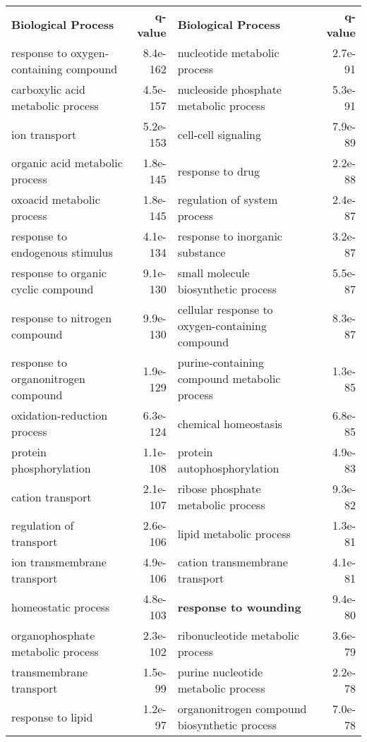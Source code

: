 \documentclass[fleqn,10pt]{SelfArx} %
\begin{document}
\begin{table}[ht]
	\centering
	\scriptsize
	\begin{tabularx}{\textwidth}{lRlR}
		\textbf{\color{white} Biological Process} & \textbf{\color{white} q-value} & \textbf{\color{white} Biological Process} & \textbf{\color{white} q-value}\\
		response to oxygen-containing compound & 8.4e-162 & nucleotide metabolic process & 2.7e-91 \\ 
		carboxylic acid metabolic process & 4.5e-157 & nucleoside phosphate metabolic process & 5.3e-91 \\ 
		ion transport & 5.2e-153 & cell-cell signaling & 7.9e-89 \\ 
		organic acid metabolic process & 1.8e-145 & response to drug & 2.2e-88 \\ 
		oxoacid metabolic process & 1.8e-145 & regulation of system process & 2.4e-87 \\ 
		response to endogenous stimulus & 4.1e-134 & response to inorganic substance & 3.2e-87 \\ 
		response to organic cyclic compound & 9.1e-130 & small molecule biosynthetic process & 5.5e-87 \\ 
		response to nitrogen compound & 9.9e-130 & cellular response to oxygen-containing compound & 8.3e-87 \\ 
		response to organonitrogen compound & 1.9e-129 & purine-containing compound metabolic process & 1.3e-85 \\ 
		oxidation-reduction process & 6.3e-124 & chemical homeostasis & 6.8e-85 \\ 
		protein phosphorylation & 1.1e-108 & protein autophosphorylation & 4.9e-83 \\ 
		cation transport & 2.1e-107 & ribose phosphate metabolic process & 9.3e-82 \\ 
		regulation of transport & 2.6e-106 & lipid metabolic process & 1.3e-81 \\ 
		ion transmembrane transport & 4.9e-106 & cation transmembrane transport & 4.1e-81 \\ 
		homeostatic process & 4.8e-103 & \textbf{response to wounding} & 9.4e-80 \\ 
		organophosphate metabolic process & 2.3e-102 & ribonucleotide metabolic process & 3.6e-79 \\ 
		transmembrane transport & 1.5e-99 & purine nucleotide metabolic process & 2.2e-78 \\ 
		response to lipid & 1.2e-97 & organonitrogen compound biosynthetic process & 7.0e-78 \\ 

\end{tabularx}
\end{table}
\end{document}
